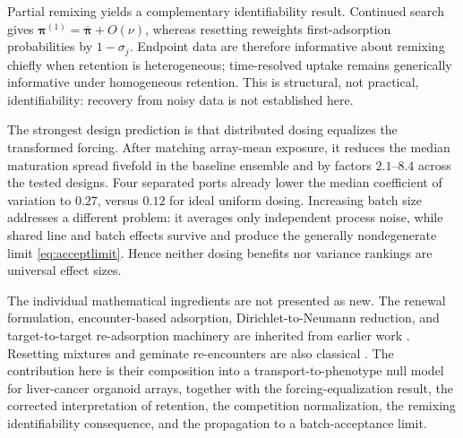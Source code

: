 \documentclass[pdflatex,sn-mathphys-num]{sn-jnl}
\numberwithin{equation}{section}
\theoremstyle{thmstyleone}%
\theoremstyle{definition}
\theoremstyle{remark}
\begin{document}
Partial remixing yields a complementary identifiability result. Continued
search gives $\bm\pi^{(1)}=\overline{\bm\pi}+O(\nu)$, whereas resetting
reweights first-adsorption probabilities by $1-\sigma_j$. Endpoint data are
therefore informative about remixing chiefly when retention is heterogeneous;
time-resolved uptake remains generically informative under homogeneous
retention. This is structural, not practical, identifiability: recovery from
noisy data is not established here.

The strongest design prediction is that distributed dosing equalizes the
transformed forcing. After matching array-mean exposure, it reduces the median
maturation spread fivefold in the baseline ensemble and by factors
$2.1$--$8.4$ across the tested designs. Four separated ports already lower the
median coefficient of variation to $0.27$, versus $0.12$ for ideal uniform
dosing. Increasing batch size addresses a different problem: it averages only
independent process noise, while shared line and batch effects survive and
produce the generally nondegenerate limit \eqref{eq:acceptlimit}. Hence neither
dosing benefits nor variance rankings are universal effect sizes.

The individual mathematical ingredients are not presented as new. The renewal formulation, encounter-based adsorption, Dirichlet-to-Neumann reduction, and target-to-target re-adsorption machinery are inherited from earlier work \cite{bressloff2025diffusion,bressloff2025asymptotic,bressloff2026renewal}. Resetting mixtures and geminate re-encounters are also classical \cite{kusmierz2014first,riascos2020random,gonzalez2021diffusive,
janson2012hitting,noyes1955kinetics,
northrup1979short,agmon1990theory,berg1977physics}. The contribution here is their composition into a transport-to-phenotype null model for liver-cancer organoid arrays, together with the forcing-equalization result, the corrected interpretation of retention, the competition normalization, the remixing identifiability consequence, and the propagation to a batch-acceptance limit.
\end{document}
